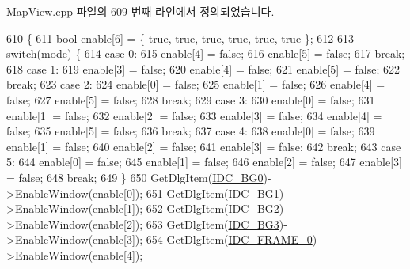 Map\+View.\+cpp 파일의 609 번째 라인에서 정의되었습니다.


\begin{DoxyCode}
610 \{
611   \textcolor{keywordtype}{bool} enable[6] = \{ \textcolor{keyword}{true}, \textcolor{keyword}{true}, \textcolor{keyword}{true}, \textcolor{keyword}{true}, \textcolor{keyword}{true}, \textcolor{keyword}{true} \};
612 
613   \textcolor{keywordflow}{switch}(mode) \{
614   \textcolor{keywordflow}{case} 0:
615     enable[4] = \textcolor{keyword}{false};
616     enable[5] = \textcolor{keyword}{false};
617     \textcolor{keywordflow}{break};
618   \textcolor{keywordflow}{case} 1:
619     enable[3] = \textcolor{keyword}{false};
620     enable[4] = \textcolor{keyword}{false};
621     enable[5] = \textcolor{keyword}{false};
622     \textcolor{keywordflow}{break};
623   \textcolor{keywordflow}{case} 2:
624     enable[0] = \textcolor{keyword}{false};
625     enable[1] = \textcolor{keyword}{false};
626     enable[4] = \textcolor{keyword}{false};
627     enable[5] = \textcolor{keyword}{false};
628     \textcolor{keywordflow}{break};
629   \textcolor{keywordflow}{case} 3:
630     enable[0] = \textcolor{keyword}{false};
631     enable[1] = \textcolor{keyword}{false};
632     enable[2] = \textcolor{keyword}{false};
633     enable[3] = \textcolor{keyword}{false};
634     enable[4] = \textcolor{keyword}{false};
635     enable[5] = \textcolor{keyword}{false};
636     \textcolor{keywordflow}{break};
637   \textcolor{keywordflow}{case} 4:
638     enable[0] = \textcolor{keyword}{false};
639     enable[1] = \textcolor{keyword}{false};
640     enable[2] = \textcolor{keyword}{false};
641     enable[3] = \textcolor{keyword}{false};
642     \textcolor{keywordflow}{break};    
643   \textcolor{keywordflow}{case} 5:
644     enable[0] = \textcolor{keyword}{false};
645     enable[1] = \textcolor{keyword}{false};
646     enable[2] = \textcolor{keyword}{false};
647     enable[3] = \textcolor{keyword}{false};
648     \textcolor{keywordflow}{break};    
649   \}
650   GetDlgItem(\mbox{\hyperlink{resource_8h_ac10192f91d4434cb8a1a3c00c0e143e3}{IDC\_BG0}})->EnableWindow(enable[0]);
651   GetDlgItem(\mbox{\hyperlink{resource_8h_a238da5af2b82de3c8d0563394f97f6b2}{IDC\_BG1}})->EnableWindow(enable[1]);
652   GetDlgItem(\mbox{\hyperlink{resource_8h_a3ebf831ad9e66fd39c265ee6c645506d}{IDC\_BG2}})->EnableWindow(enable[2]);
653   GetDlgItem(\mbox{\hyperlink{resource_8h_a7bde682dd1cfa236c27f69d59f2382f7}{IDC\_BG3}})->EnableWindow(enable[3]);
654   GetDlgItem(\mbox{\hyperlink{resource_8h_ab4bccbcf89d4ccb95d624cf128bfb2db}{IDC\_FRAME\_0}})->EnableWindow(enable[4]);

\end{DoxyCode}
